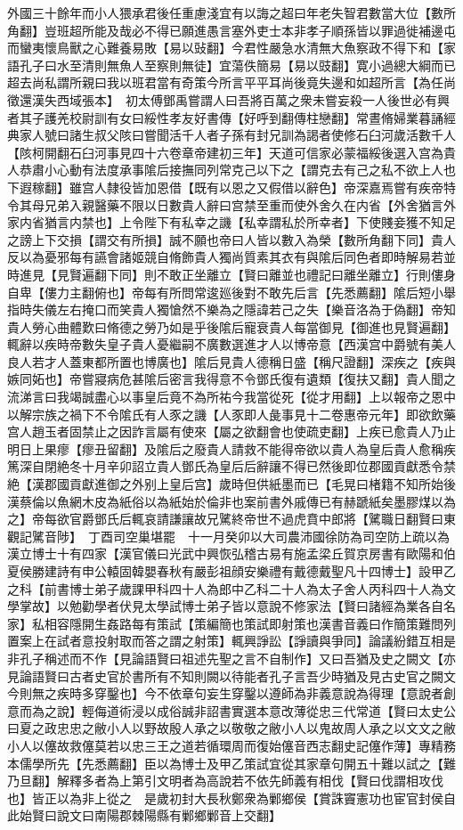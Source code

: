 外國三十餘年而小人猥承君後任重慮淺宜有以誨之超曰年老失智君數當大位【數所角翻】豈班超所能及哉必不得已願進愚言塞外吏士本非孝子順孫皆以罪過徙補邊屯而蠻夷懷鳥獸之心難養易敗【易以䜴翻】今君性嚴急水清無大魚察政不得下和【家語孔子曰水至清則無魚人至察則無徒】宜蕩佚簡易【易以豉翻】寛小過總大綱而已超去尚私謂所親曰我以班君當有奇策今所言平平耳尚後竟失邊和如超所言【為任尚徵還漢失西域張本】　初太傅鄧禹嘗謂人曰吾將百萬之衆未嘗妄殺一人後世必有興者其子護羌校尉訓有女曰綏性孝友好書傳【好呼到翻傳柱戀翻】常晝脩婦業暮誦經典家人號曰諸生叔父陔曰嘗聞活千人者子孫有封兄訓為謁者使修石臼河歲活數千人【陔柯開翻石臼河事見四十六卷章帝建初三年】天道可信家必蒙福綏後選入宫為貴人恭肅小心動有法度承事隂后接撫同列常克己以下之【謂克去有己之私不欲上人也下遐稼翻】雖宫人隸役皆加恩借【既有以恩之又假借以辭色】帝深嘉焉嘗有疾帝特令其母兄弟入親醫藥不限以日數貴人辭曰宫禁至重而使外舍久在内省【外舍猶言外家内省猶言内禁也】上令陛下有私幸之譏【私幸謂私於所幸者】下使賤妾獲不知足之謗上下交損【謂交有所損】誠不願也帝曰人皆以數入為榮【數所角翻下同】貴人反以為憂邪每有讌會諸姬競自脩飾貴人獨尚質素其衣有與隂后同色者即時解易若並時進見【見賢遍翻下同】則不敢正坐離立【賢曰離並也禮記曰離坐離立】行則僂身自卑【僂力主翻俯也】帝每有所問常逡廵後對不敢先后言【先悉薦翻】隂后短小舉指時失儀左右掩口而笑貴人獨愴然不樂為之隱諱若己之失【樂音洛為于偽翻】帝知貴人勞心曲體歎曰脩德之勞乃如是乎後隂后寵衰貴人每當御見【御進也見賢遍翻】輒辭以疾時帝數失皇子貴人憂繼嗣不廣數選進才人以博帝意【西漢宫中爵號有美人良人若才人蓋東都所置也博廣也】隂后見貴人德稱日盛【稱尺證翻】深疾之【疾與嫉同妬也】帝嘗寢病危甚隂后密言我得意不令鄧氏復有遺類【復扶又翻】貴人聞之流涕言曰我竭誠盡心以事皇后竟不為所祐今我當從死【從才用翻】上以報帝之恩中以解宗族之禍下不令隂氏有人豕之譏【人豕即人彘事見十二卷惠帝元年】即欲飲藥宫人趙玉者固禁止之因詐言屬有使來【屬之欲翻會也使疏吏翻】上疾已愈貴人乃止明日上果瘳【瘳丑留翻】及隂后之廢貴人請救不能得帝欲以貴人為皇后貴人愈稱疾篤深自閉絶冬十月辛卯詔立貴人鄧氏為皇后后辭讓不得已然後即位郡國貢獻悉令禁絶【漢郡國貢獻進御之外别上皇后宫】歲時但供紙墨而已【毛晃曰楮籍不知所始後漢蔡倫以魚網木皮為紙俗以為紙始於倫非也案前書外戚傳已有赫蹏紙矣墨膠煤以為之】帝每欲官爵鄧氏后輒哀請謙讓故兄騭終帝世不過虎賁中郎將【騭職日翻賢曰東觀記騭音陟】　丁酉司空巢堪罷　十一月癸卯以大司農沛國徐防為司空防上疏以為漢立博士十有四家【漢官儀曰光武中興恢弘稽古易有施孟梁丘賀京房書有歐陽和伯夏侯勝建詩有申公轅固韓嬰春秋有嚴彭祖顔安樂禮有戴德戴聖凡十四博士】設甲乙之科【前書博士弟子歲課甲科四十人為郎中乙科二十人為太子舍人丙科四十人為文學掌故】以勉勸學者伏見太學試博士弟子皆以意說不修家法【賢曰諸經為業各自名家】私相容隱開生姦路每有策試【策編簡也策試即射策也漢書音義曰作簡策難問列置案上在試者意投射取而答之謂之射策】輒興諍訟【諍讀與爭同】論議紛錯互相是非孔子稱述而不作【見論語賢曰祖述先聖之言不自制作】又曰吾猶及史之闕文【亦見論語賢曰古者史官於書所有不知則闕以待能者孔子言吾少時猶及見古史官之闕文今則無之疾時多穿鑿也】今不依章句妄生穿鑿以遵師為非義意說為得理【意說者創意而為之說】輕侮道術浸以成俗誠非詔書實選本意改薄從忠三代常道【賢曰太史公曰夏之政忠忠之敝小人以野故殷人承之以敬敬之敝小人以鬼故周人承之以文文之敝小人以僿故救僿莫若以忠三王之道若循環周而復始僿音西志翻史記僿作薄】專精務本儒學所先【先悉薦翻】臣以為博士及甲乙策試宜從其家章句開五十難以試之【難乃旦翻】解釋多者為上第引文明者為高說若不依先師義有相伐【賢曰伐謂相攻伐也】皆正以為非上從之　是歲初封大長秋鄭衆為鄛鄉侯【賞誅竇憲功也宦官封侯自此始賢曰說文曰南陽郡棘陽縣有鄛鄉鄛音上交翻】

